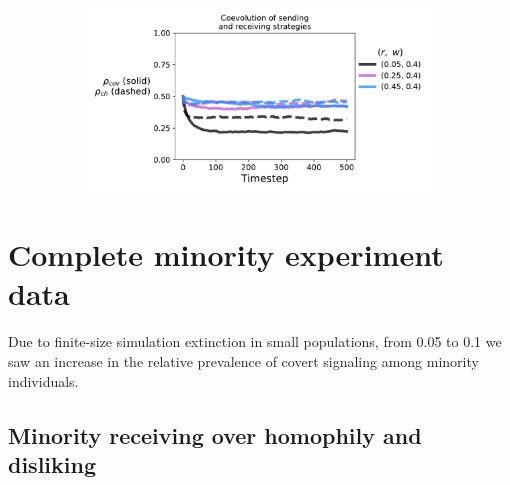 \documentclass[11pt,letterpaper]{article}
\begin{document}
\begin{appendices}
\begin{figure}[H]
\begin{subfigure}{0.49\textwidth}
  \caption{}
  \end{subfigure}
  \begin{subfigure}{0.49\textwidth}
    \includegraphics[width=\textwidth]{Figures/receptivity_evo_w=0p4.pdf}
  \caption{}
  \end{subfigure}
  \caption{}
  \label{fig:}
\end{figure}

\section{Complete minority experiment data}

Due to finite-size simulation extinction in small populations, from 0.05 to
0.1 we saw an increase in the relative prevalence of covert signaling among
minority individuals. 



\subsection{Minority receiving over homophily and disliking}




\end{appendices}
\end{document}
